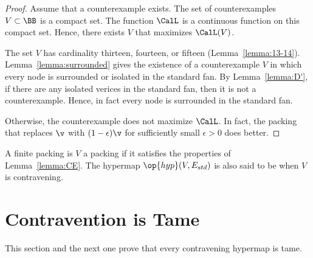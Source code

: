 \begin{proof} Assume that a counterexample exists.  The set of
  counterexamples $V\subset\BB$ is a compact set.  The function
  $\CalL$ is a continuous function on this compact set.  Hence, there
  exists $V$ that maximizes $\CalL(V)$.

  The set $V$ has cardinality thirteen, fourteen,  or fifteen
  (Lemma~\ref{lemma:13-14}). Lemma~\ref{lemma:surrounded} gives the
  existence of a counterexample $V$ in which every node is
  surrounded or isolated in the standard fan.  By
  Lemma~\ref{lemma:D'}, if there are any isolated verices in the
  standard fan, then it is not a counterexample.  Hence, in fact every
  node is surrounded in the standard fan.

    Otherwise, the counterexample does not
  maximize $\CalL$.  In fact, the packing that replaces $\v$ with $(1-\epsilon)\v$ for sufficiently small $\epsilon>0$ does better.
\end{proof}


\begin{definition}[contravening]
  A finite packing is $V$ a  packing if it
  satisfies the properties of Lemma~\ref{lemma:CE}.  The
 hypermap $\op{hyp}(V,E_{std})$ is also said to be
   when $V$ is contravening.
\end{definition}






\section{Contravention is Tame}
%
\label{sec:contraproof}

This section and the next one prove that every contravening hypermap is tame.

